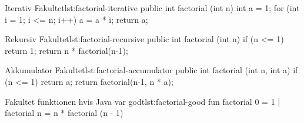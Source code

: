 

	\begin{JavaCode}{Iterativ Fakultet}{lst:factorial-iterative}
		public int factorial (int n) {
			int a = 1;
			for (int i = 1; i <= n; i++)
				a = a * i;
			return a;
		}
	\end{JavaCode}

	\begin{JavaCode}{Rekursiv Fakultet}{lst:factorial-recursive}
		public int factorial (int n) {
			if (n <= 1)  return 1;
			return n * factorial(n-1);
		}
	\end{JavaCode}

	\begin{JavaCode}{Akkumulator Fakultet}{lst:factorial-accumulator}
		public int factorial (int n, int a) {
			if (n <= 1)  return a;
			return factorial(n-1, n * a);
		}
	\end{JavaCode}

	\begin{JavaCode}{Fakultet funktionen hvis Java var godt}{lst:factorial-good}
		fun factorial 0  =  1
		  | factorial n  =  n * factorial (n - 1)
	\end{JavaCode}

\blindtext

